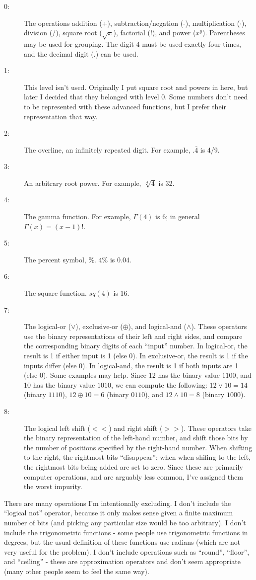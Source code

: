 \documentclass[twocolumn,twoside,draft,american]{report}
\begin{document}
\begin{description}
\item[0:]
 The operations addition (+), subtraction/negation (-),
  multiplication ($\cdot$), division (/),
  square root ($\sqrt{x}$), factorial (!), and power ($x^y$).
 Parentheses may be used for grouping.
 The digit 4 must be used exactly four times, and the decimal digit (.)
 can be used.
\item[1:]
 This level isn't used.  Originally I put square root and powers in here,
 but later I decided that they belonged with level 0.
 Some numbers don't need to be represented with these advanced functions,
 but I prefer their representation that way.
\item[2:]
 The overline, an infinitely repeated digit.
   For example, $.\overline{4}$ is 4/9.
\item[3:]
 An arbitrary root power.  For example, ${\sqrt[.4]{4}}$ is 32.
\item[4:]
 The gamma function. For example, $\Gamma(4)$ is 6;
 in general $\Gamma(x) = (x-1)!$.
\item[5:]
 The percent symbol, \%.  $4\%$ is 0.04.
\item[6:]
 The square function.  $sq(4)$ is 16.
\item[7:]
 The logical-or ($\lor$), exclusive-or ($\oplus$), and logical-and ($\land$).
 These operators use the binary representations of their left and right
 sides, and compare the corresponding binary digits of each ``input'' number.
 In logical-or, the result is 1 if either input is 1 (else 0).
 In exclusive-or, the result is 1 if the inputs differ (else 0).
 In logical-and, the result is 1 if both inputs are 1 (else 0).
 Some examples may help.  Since 12 has the binary value $1100$, and
 10 has the binary value $1010$, we can compute the following:
 $12 \lor 10 = 14$ (binary $1110$),
 $12 \oplus 10 = 6$ (binary $0110$), and
 $12 \land 10 = 8$ (binary $1000$).
\item[8:]
 The logical left shift ($<<$)  and right shift ($>>$).
 These operators take the binary representation of the left-hand number,
 and shift those bits by the number of positions specified by the
 right-hand number.
 When shifting to the right, the rightmost bits ``disappear''; when
 when shifing to the left, the rightmost bits being added are
 set to zero.
 Since these are primarily computer operations, and are arguably less common,
 I've assigned them the worst impurity.
\end{description}

There are many operations I'm intentionally excluding.
I don't include the ``logical not'' operator, because it only makes
sense given a finite maximum number of bits (and picking any
particular size would be too arbitrary).
I don't include the trigonometric functions - some people use trigonometric
functions in degrees, but the usual definition of these functions
use radians (which are not very useful for the problem).
I don't include operations such as ``round'', ``floor'', and
``ceiling'' - these are approximation operators and don't seem appropriate
(many other people seem to feel the same way).
\end{document}
